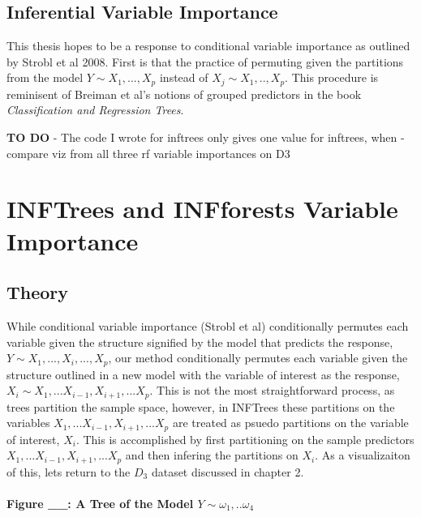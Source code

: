\documentclass[12pt,twoside]{reedthesis}
\begin{document}
  \section{Inferential Variable
  Importance}\label{inferential-variable-importance}
  
  This thesis hopes to be a response to conditional variable importance as
  outlined by Strobl et al 2008. First is that the practice of permuting
  given the partitions from the model \(Y \sim X_1,...,X_p\) instead of
  \(X_j \sim X_1,..,X_p\). This procedure is reminisent of Breiman et al's
  notions of grouped predictors in the book \emph{Classification and
  Regression Trees}.
  
  \textbf{TO DO} - The code I wrote for inftrees only gives one value for
  inftrees, when - compare viz from all three rf variable importances on
  D3
  
  \chapter{INFTrees and INFforests Variable
  Importance}\label{inftrees-and-infforests-variable-importance}
  
  \section{Theory}\label{theory}
  
  While conditional variable importance (Strobl et al) conditionally
  permutes each variable given the structure signified by the model that
  predicts the response, \(Y \sim X_1,...,X_i,...,X_p\), our method
  conditionally permutes each variable given the structure outlined in a
  new model with the variable of interest as the response,
  \(X_i \sim X_1,...X_{i-1},X_{i+1},...X_p\). This is not the most
  straightforward process, as trees partition the sample space, however,
  in INFTrees these partitions on the variables
  \(X_1,...X_{i-1},X_{i+1},...X_p\) are treated as psuedo partitions on
  the variable of interest, \(X_i\). This is accomplished by first
  partitioning on the sample predictors \(X_1,...X_{i-1},X_{i+1},...X_p\)
  and then infering the partitions on \(X_i\). As a visualizaiton of this,
  lets return to the \(D_{3}\) dataset discussed in chapter 2.
  
  \subsubsection{\texorpdfstring{Figure \_\_: A Tree of the Model
  \(Y \sim \omega_1,.. \omega_4\)}{Figure \_\_: A Tree of the Model Y \textbackslash{}sim \textbackslash{}omega\_1,.. \textbackslash{}omega\_4}}\label{figure-__-a-tree-of-the-model-y-sim-omega_1..-omega_4}
  
\end{document}
